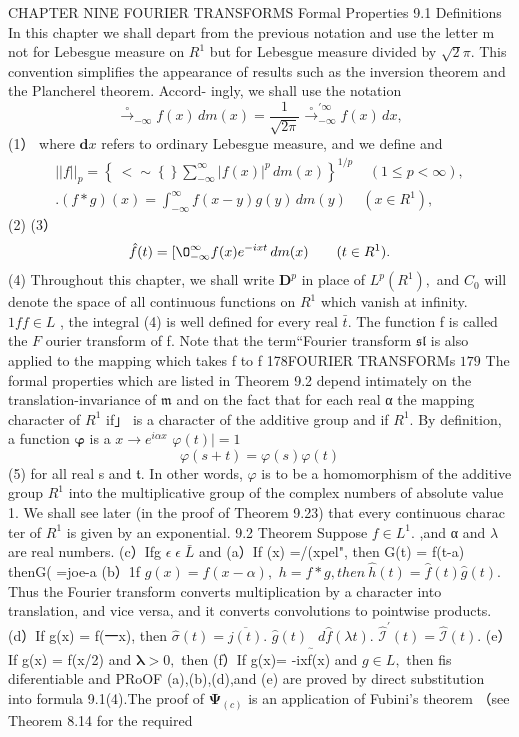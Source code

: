 CHAPTER NINE FOURIER TRANSFORMS Formal Properties 9.1 Definitions In this chapter we shall depart from the previous notation and use the letter m not for Lebesgue measure on $R^{1}$ but for Lebesgue measure divided by $\sqrt{2}\pi.$ This convention simplifies the appearance of results such as the inversion theorem and the Plancherel theorem. Accord- ingly, we shall use the notation $$ \left.\stackrel{\circ}{\to}_{-\infty}f(x)\,d m(x)=\frac{1}{\sqrt{2\pi}}\right.\stackrel{\circ}{\to}_{-\infty}^{\prime\infty}f(x)\,d x, $$ (1） where ${\boldsymbol{d}}x$ refers to ordinary Lebesgue measure, and we define and $$ \begin{array}{c}{{||f||_{p}=\displaystyle\left\{\displaystyle\ <\sim\left\{\right\}\sum_{-\infty}^{\infty}|f(x)|^{p}\,d m(x)\right\}^{1/p}~~~~~(1\leq p<\infty),}}\\ {{ .(f\ast g)(x)=\displaystyle\int_{-\infty}^{\infty}f(x-y)g(y)\,d m(y)~~~~~(x\in R^{1}),}}\end{array} $$ (2) (3） $$ \hat{f}(t)= [\O_{-\infty}^{\infty}f(x)e^{-i x t}\,d m(x)\qquad(t\in R^{1}). $$ (4) Throughout this chapter, we shall write ${\boldsymbol{D}}^{p}$ in place of $L^{p}(R^{1}),$ and $C_{0}$ will denote the space of all continuous functions on $R^{1}$ which vanish at infinity. $1f f\in L$ , the integral (4) is well defined for every real ${\bar{t}}.$ The function f is called the ${\mathbf{}}F$ ourier transform of f. Note that the term“Fourier transform ${\mathfrak{s l}}$ is also applied to the mapping which takes f to f 178FOURIER TRANSFORMs $179$ The formal properties which are listed in Theorem 9.2 depend intimately on the translation-invariance of ${\mathfrak{m}}$ and on the fact that for each real α the mapping character of $R^{1}$ if」 is a character of the additive group and if $R^{1}.$ By definition, a function $\boldsymbol{\varphi}$ is a $x\to e^{i\alpha x}$ $\varphi(t)|=1$ $$ \varphi(s+t)=\varphi(s)\varphi(t) $$ (5) for all real s and ${\mathfrak{t}}.$ In other words, $\varphi$ is to be a homomorphism of the additive group $R^{1}$ into the multiplicative group of the complex numbers of absolute value 1. We shall see later (in the proof of Theorem 9.23) that every continuous charac ter of $R^{1}$ is given by an exponential. 9.2 Theorem Suppose $f\in L^{1}.$ ,and α and $\lambda$ are real numbers. (c）Ifg $\scriptstyle{\epsilon\;\epsilon\;{\bar{L}}}$ and (a）If (x) =/(xpel", then G(t) = f(t-a) thenG( =joe-a (b）1f $g(x)=f(x-\alpha),$ $h=f*g,t h e n\ {\hat{h}}(t)={\hat{f}}(t){\hat{g}}(t).$ Thus the Fourier transform converts multiplication by a character into translation, and vice versa, and it converts convolutions to pointwise products. (d）If g(x) = f(一x), then ${\hat{\sigma}}(t)={\overline{{j(t)}}}.$ ${\hat{g}}(t)_{_{\sim}}\ d{\hat{f}}(\lambda t).$ ${\hat{\mathcal{I}}}^{\prime}(t)={\hat{\mathcal{I}}}(t).$ (e）If g(x) = f(x/2) and ${\boldsymbol{\lambda}}>0,$ then (f）If g(x)= -ixf(x) and $g\in L,$ then fis diferentiable and PRoOF (a),(b),(d),and (e) are proved by direct substitution into formula 9.1(4).The proof of $\mathbf{\Psi}_{(c)}$ is an application of Fubini's theorem （see Theorem 8.14 for the required 